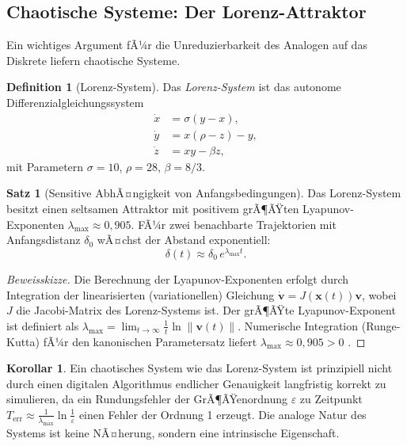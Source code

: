 ﻿\documentclass[a4paper,12pt]{article}
\theoremstyle{definition}
\newtheorem{definition}{Definition}
\newtheorem{satz}{Satz}
\newtheorem{korollar}{Korollar}
\begin{document}
\subsection{Chaotische Systeme: Der Lorenz-Attraktor}

Ein wichtiges Argument fÃ¼r die Unreduzierbarkeit des Analogen auf das Diskrete
liefern chaotische Systeme.

\begin{definition}[Lorenz-System]
Das \emph{Lorenz-System} ist das autonome Differenzialgleichungssystem
\begin{align*}
\dot{x} &= \sigma(y - x), \\
\dot{y} &= x(\rho - z) - y, \\
\dot{z} &= xy - \beta z,
\end{align*}
mit Parametern $\sigma = 10$, $\rho = 28$, $\beta = 8/3$.
\end{definition}

\begin{satz}[Sensitive AbhÃ¤ngigkeit von Anfangsbedingungen]
\label{satz:chaos}
Das Lorenz-System besitzt einen seltsamen Attraktor mit positivem grÃ¶ÃŸten
Lyapunov-Exponenten $\lambda_{\max} \approx 0{,}905$.  FÃ¼r zwei benachbarte
Trajektorien mit Anfangsdistanz $\delta_0$ wÃ¤chst der Abstand exponentiell:
\[
\delta(t) \approx \delta_0 \, e^{\lambda_{\max} t}.
\]
\end{satz}

\begin{proof}[Beweisskizze]
Die Berechnung der Lyapunov-Exponenten erfolgt durch Integration der
linearisierten (variationellen) Gleichung $\dot{\mathbf{v}} = J(\mathbf{x}(t)) \mathbf{v}$,
wobei $J$ die Jacobi-Matrix des Lorenz-Systems ist.
Der grÃ¶ÃŸte Lyapunov-Exponent ist definiert als
$\lambda_{\max} = \lim_{t\to\infty} \frac{1}{t} \ln \|\mathbf{v}(t)\|$.
Numerische Integration (Runge-Kutta) fÃ¼r den kanonischen Parametersatz
liefert $\lambda_{\max} \approx 0{,}905 > 0$ \citep{Sparrow1982}.
\end{proof}

\begin{korollar}
Ein chaotisches System wie das Lorenz-System ist prinzipiell nicht durch
einen digitalen Algorithmus endlicher Genauigkeit langfristig korrekt zu simulieren,
da ein Rundungsfehler der GrÃ¶ÃŸenordnung $\varepsilon$ zu Zeitpunkt $T_{\mathrm{err}} \approx \frac{1}{\lambda_{\max}} \ln \frac{1}{\varepsilon}$ einen Fehler der Ordnung 1 erzeugt.  Die analoge Natur des Systems
ist keine NÃ¤herung, sondern eine intrinsische Eigenschaft.
\end{korollar}
\end{document}
